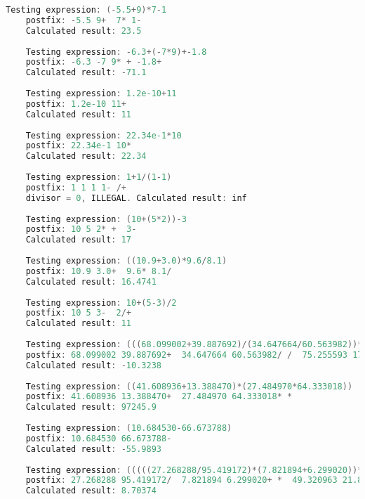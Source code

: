 \documentclass[UTF8]{ctexart}
\begin{document}
\begin{lstlisting}[language=c++, breaklines=true, frame=shadowbox, rulesepcolor=\color{red!20!green!20!blue!20}]
    Testing expression: (-5.5+9)*7-1
    postfix: -5.5 9+  7* 1-
    Calculated result: 23.5
    
    Testing expression: -6.3+(-7*9)+-1.8
    postfix: -6.3 -7 9* + -1.8+
    Calculated result: -71.1
    
    Testing expression: 1.2e-10+11
    postfix: 1.2e-10 11+
    Calculated result: 11
    
    Testing expression: 22.34e-1*10
    postfix: 22.34e-1 10*
    Calculated result: 22.34
    
    Testing expression: 1+1/(1-1)
    postfix: 1 1 1 1- /+
    divisor = 0, ILLEGAL. Calculated result: inf
    
    Testing expression: (10+(5*2))-3
    postfix: 10 5 2* +  3-
    Calculated result: 17
    
    Testing expression: ((10.9+3.0)*9.6/8.1)
    postfix: 10.9 3.0+  9.6* 8.1/
    Calculated result: 16.4741
    
    Testing expression: 10+(5-3)/2
    postfix: 10 5 3-  2/+
    Calculated result: 11
    
    Testing expression: (((68.099002+39.887692)/(34.647664/60.563982))*((75.255593/17.044588)/(14.416944-95.144505)))
    postfix: 68.099002 39.887692+  34.647664 60.563982/ /  75.255593 17.044588/  14.416944 95.144505- / *
    Calculated result: -10.3238
    
    Testing expression: ((41.608936+13.388470)*(27.484970*64.333018))
    postfix: 41.608936 13.388470+  27.484970 64.333018* *
    Calculated result: 97245.9
    
    Testing expression: (10.684530-66.673788)
    postfix: 10.684530 66.673788-
    Calculated result: -55.9893
    
    Testing expression: (((((27.268288/95.419172)*(7.821894+6.299020))*((49.320963+21.897031)/(35.712760+41.395306)))*(((60.847804*57.261879)/(5.832087+22.183905))/((60.399182*20.883816)*(22.504349*6.179998))))*((((60.707419*8.706931)+(73.558763+79.616688))/((30.466628+75.676748)*(28.376110/46.122623)))-(((48.637349*30.646687)/(48.451186-27.893918))*((71.251564*43.824580)/(10.415967-79.369488)))))
    postfix: 27.268288 95.419172/  7.821894 6.299020+ *  49.320963 21.897031+  35.712760 41.395306+ / *  60.847804 57.261879*  5.832087 22.183905+ /  60.399182 20.883816*  22.504349 6.179998* * / *  60.707419 8.706931*  73.558763 79.616688+ +  30.466628 75.676748+  28.376110 46.122623/ * /  48.637349 30.646687*  48.451186 27.893918- /  71.251564 43.824580*  10.415967 79.369488- / * - *
    Calculated result: 8.70374
    

\end{lstlisting}
\end{document}
